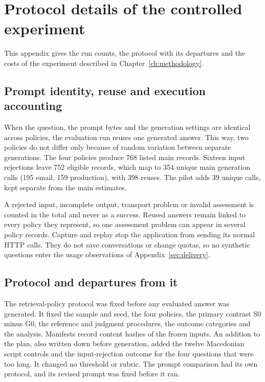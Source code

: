 \section{Protocol details of the controlled experiment}
\label{app:protocol}

This appendix gives the run counts, the protocol with its departures and the costs of the experiment described in Chapter~\ref{ch:methodology}.

\subsection{Prompt identity, reuse and execution accounting}
\label{sec:method-accounting}

When the question, the prompt bytes and the generation settings are identical across policies, the evaluation run reuses one generated answer. This way, two policies do not differ only because of random variation between separate generations. The four policies produce 768 listed main records. Sixteen input rejections leave 752 eligible records, which map to 354 unique main generation calls (195 email, 159 production), with 398 reuses. The pilot adds 39 unique calls, kept separate from the main estimates.

A rejected input, incomplete output, transport problem or invalid assessment is counted in the total and never as a success. Reused answers remain linked to every policy they represent, so one assessment problem can appear in several policy records. Capture and replay stop the application from sending its normal HTTP calls. They do not save conversations or change quotas, so no synthetic questions enter the usage observations of Appendix~\ref{sec:delivery}.

\subsection{Protocol and departures from it}
\label{sec:method-deviations}

The retrieval-policy protocol was fixed before any evaluated answer was generated. It fixed the sample and seed, the four policies, the primary contrast S0 minus G0, the reference and judgment procedures, the outcome categories and the analysis. Manifests record content hashes of the frozen inputs. An addition to the plan, also written down before generation, added the twelve Macedonian script controls and the input-rejection outcome for the four questions that were too long. It changed no threshold or rubric. The prompt comparison had its own protocol, and its revised prompt was fixed before it ran.

